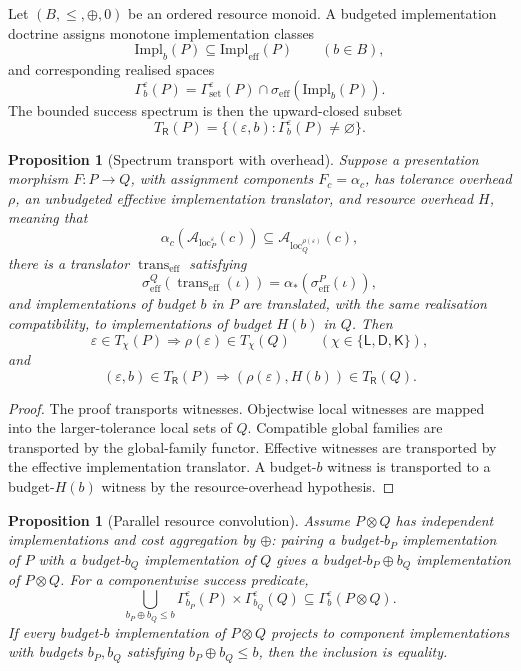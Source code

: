 \documentclass[11pt]{article}
\theoremstyle{plain}
\newtheorem{proposition}[theorem]{Proposition}
\theoremstyle{definition}
\theoremstyle{remark}
\newcommand{\LocalAdm}{\mathcal{A}_{\mathrm{loc}}}
\newcommand{\eps}{\varepsilon}
\begin{document}
Let $(B,\le,\oplus,0)$ be an ordered resource monoid. A budgeted implementation
doctrine assigns monotone implementation classes
\[
\mathrm{Impl}_b(P)\subseteq\mathrm{Impl}_{\mathrm{eff}}(P)
\qquad(b\in B),
\]
and corresponding realised spaces
\[
\Gamma_b^\eps(P)=\Gamma_{\mathrm{set}}^\eps(P)
\cap \sigma_{\mathrm{eff}}(\mathrm{Impl}_b(P)).
\]
The bounded success spectrum is then the upward-closed subset
\[
T_{\mathsf R}(P)=\{(\eps,b):\Gamma_b^\eps(P)\ne\varnothing\}.
\]

\begin{proposition}[Spectrum transport with overhead]
\label{prop:overhead-spectrum-transport}
Suppose a presentation morphism $F:P\to Q$, with assignment components
$F_c=\alpha_c$, has tolerance overhead $\rho$, an unbudgeted effective
implementation translator, and resource overhead $H$, meaning that
\[
\alpha_c(\LocalAdm_P^\eps(c))\subseteq \LocalAdm_Q^{\rho(\eps)}(c),
\]
there is a translator $\operatorname{trans}_{\mathrm{eff}}$ satisfying
\[
\sigma_{\mathrm{eff}}^Q(\operatorname{trans}_{\mathrm{eff}}(\iota))
=\alpha_*(\sigma_{\mathrm{eff}}^P(\iota)),
\]
and implementations of budget $b$ in $P$ are translated, with the same
realisation compatibility, to implementations of budget $H(b)$ in $Q$. Then
\[
\eps\in T_\chi(P)\Longrightarrow \rho(\eps)\in T_\chi(Q)
\qquad(\chi\in\{\mathsf L,\mathsf D,\mathsf K\}),
\]
and
\[
(\eps,b)\in T_{\mathsf R}(P)
\Longrightarrow
(\rho(\eps),H(b))\in T_{\mathsf R}(Q).
\]
\end{proposition}

\begin{proof}
The proof transports witnesses. Objectwise local witnesses are mapped into the
larger-tolerance local sets of $Q$. Compatible global families are transported by
the global-family functor. Effective witnesses are transported by the effective
implementation translator. A budget-$b$ witness is transported to a
budget-$H(b)$ witness by the resource-overhead hypothesis.
\end{proof}

\begin{proposition}[Parallel resource convolution]
\label{prop:parallel-resource-convolution}
Assume $P\otimes Q$ has independent implementations and cost aggregation by
$\oplus$: pairing a budget-$b_P$ implementation of $P$ with a budget-$b_Q$
implementation of $Q$ gives a budget-$b_P\oplus b_Q$ implementation of
$P\otimes Q$. For a componentwise success predicate,
\[
\bigcup_{b_P\oplus b_Q\le b}
\Gamma_{b_P}^\eps(P)\times\Gamma_{b_Q}^\eps(Q)
\subseteq
\Gamma_b^\eps(P\otimes Q).
\]
If every budget-$b$ implementation of $P\otimes Q$ projects to component
implementations with budgets $b_P,b_Q$ satisfying $b_P\oplus b_Q\le b$, then the
inclusion is equality.
\end{proposition}
\end{document}
